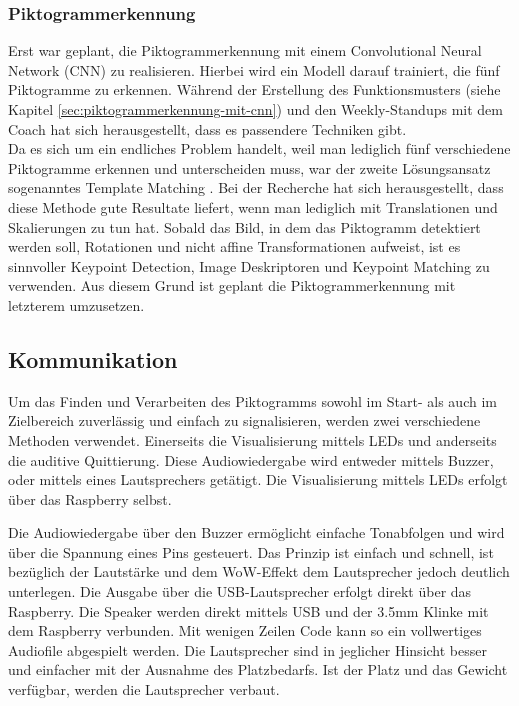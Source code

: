 \subsubsection{Piktogrammerkennung}
\label{piktogrammerkennung}
Erst war geplant, die Piktogrammerkennung mit einem Convolutional Neural Network (CNN) zu realisieren. Hierbei wird ein Modell darauf trainiert, die fünf Piktogramme zu erkennen. Während der Erstellung des Funktionsmusters (siehe Kapitel \ref{sec:piktogrammerkennung-mit-cnn}) und den Weekly-Standups mit dem Coach hat sich herausgestellt, dass es passendere Techniken gibt.\\
Da es sich um ein endliches Problem handelt, weil man lediglich fünf verschiedene Piktogramme erkennen und unterscheiden muss, war der zweite Lösungsansatz sogenanntes Template Matching \cite{OpenCV-Template-Matching}. Bei der Recherche hat sich herausgestellt, dass diese Methode gute Resultate liefert, wenn man lediglich mit Translationen und Skalierungen zu tun hat. Sobald das Bild, in dem das Piktogramm detektiert werden soll, Rotationen und nicht affine Transformationen aufweist, ist es sinnvoller Keypoint Detection, Image Deskriptoren und Keypoint Matching \cite{OpenCV-Feature-Matching} zu verwenden. Aus diesem Grund ist geplant die Piktogrammerkennung mit letzterem umzusetzen.



\subsection {Kommunikation}
\label{sec:kommunikation}
Um das Finden und Verarbeiten des Piktogramms sowohl im Start- als auch im Zielbereich zuverlässig und einfach zu signalisieren, werden zwei verschiedene Methoden verwendet. Einerseits die Visualisierung mittels LEDs und anderseits die auditive Quittierung. Diese Audiowiedergabe wird entweder mittels Buzzer, oder mittels eines Lautsprechers getätigt. Die Visualisierung mittels LEDs erfolgt über das Raspberry selbst.

Die Audiowiedergabe über den Buzzer ermöglicht einfache Tonabfolgen und wird über die Spannung eines Pins gesteuert. Das Prinzip ist einfach und schnell, ist bezüglich der Lautstärke und dem \glqq WoW-Effekt \grqq{} dem Lautsprecher jedoch deutlich unterlegen.
Die Ausgabe über die USB-Lautsprecher erfolgt direkt über das Raspberry. Die Speaker werden direkt mittels USB und der 3.5mm Klinke mit dem Raspberry verbunden. Mit wenigen Zeilen Code kann so ein vollwertiges Audiofile abgespielt werden.
Die Lautsprecher sind in jeglicher Hinsicht besser und einfacher mit der Ausnahme des Platzbedarfs. Ist der Platz und das Gewicht verfügbar, werden die Lautsprecher verbaut.


